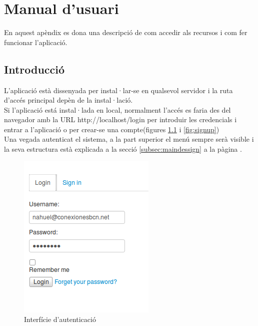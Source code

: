 \chapter{Manual d'usuari}
\label{cha:userguide}
En aquest apèndix es dona una descripció de com accedir als recursos i com fer funcionar l'aplicació.

\section{Introducció}
L'aplicació est\`{a} dissenyada per instal·lar-se en qualsevol servidor i la ruta d'accés principal depèn de la instal·lació.\\

Si l'aplicació est\'{a} instal·lada en local, normalment l'accés es faria des del navegador amb la URL http://localhost/login per introduir les credencials i entrar a l'aplicació o per crear-se una compte(figures \ref{fig:login} i \ref{fig:signup}) \\

Una vegada autenticat el sistema, a la part superior el menú sempre serà visible i la seva estructura est\`{a} explicada a la secció \ref{subsec:maindessign} a la p\`{a}gina \pageref{menudessign}.\\

\begin{figure}[h!]
  \centering
  \includegraphics[scale=0.4]{img/userguide/login.png}
  \caption{Interfície d'autenticació}
  \label{fig:login}
\end{figure}

